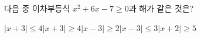 다음 중 이차부등식 $x^2+6x-7\ge 0$과 해가 같은 것은?
\begin{choices32}{$|x+3|\le 4$}{$|x+3|\ge 4$}{$|x-3|\ge 2$}{$|x-3|\le 3$}{$|x+2|\ge 5$}\end{choices32}
